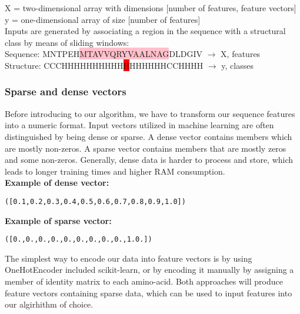 \documentclass[12pt]{article}
\begin{document}
\indent X =  two-dimensional array with dimensions [number of features, feature vectors]\\
\indent   y  =  one-dimensional array of size [number of features]\\

\noindent Inputs are generated by associating a region in the sequence with a structural class by means of sliding windows: \\

   Sequence:    MNTPEH\colorbox{pink}{MTAVVQRYVAALNAG}DLDGIV    $ \longrightarrow $ X, features\\

   Structure: CCCHHHHHHHHHH\colorbox{red}{H}HHHHHHCCHHHH  $ \longrightarrow $ y, classes\\
   

\subsubsection{Sparse and dense vectors}

Before introducing to our algorithm, we have to transform our sequence features into a numeric format. 
Input vectors utilized in machine learning are often distinguished by being dense or sparse. A dense vector contains members which are mostly non-zeros. A sparse vector contains members that are mostly zeros and some non-zeros. Generally, dense data is harder to process and store, which leads to longer training times and higher RAM consumption.\\ 

\noindent \textbf{Example of dense vector:}

\begin{alltt} 
	([ 0.1,   0.2,   0.3,   0.4,   0.5,   0.6,   0.7,   0.8,   0.9,   1.0])
	
\end{alltt} 
	\textbf{Example of sparse vector:}
\begin{alltt} 
	([ 0.,    0.,    0.,    0.,    0.,    0.,    0.,    0.,    0.,    1.0.])
	
\end{alltt} 

\noindent The simplest way to encode our data into feature vectors is by using OneHotEncoder included scikit-learn, or by encoding it manually by assigning a member of identity matrix to each amino-acid. Both approaches will produce feature vectors containing sparse data, which can be used to input features into our algirhithm of choice. \\
\newpage
\end{document}
